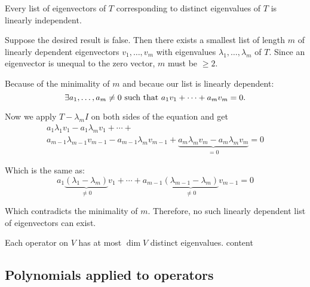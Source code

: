\setcounter{thm}{10}
\begin{thm}
  \label{thm: linearly independent eigenvectors}
  Every list of eigenvectors of $T$ corresponding to distinct eigenvalues of $T$ is linearly independent.
\end{thm}
\begin{prf}
  Suppose the desired result is false. Then there exists a smallest list of length $m$ of linearly depen\-dent eigenvectors $v_1, \dots, v_m$ with eigenvalues $\lambda_1, \dots, \lambda_m$ of $T$. Since an eigenvector is unequal to the zero vector, $m$ must be $\geq 2$.

  Because of the minimality of $m$ and becaue our list is linearly dependent: 
  \begin{equation}
    \exists a_1, \dots, a_m \neq 0$ such that $a_1 v_1 + \cdots + a_m v_m = 0. 
  \end{equation}
  
  Now we apply $T-\lambda_m I$ on both sides of the equation and get
  \begin{equation}
    \begin{gathered}
      a_1 \lambda_1 v_1 - a_1 \lambda_m v_1
      + \cdots + \\
      a_{m-1} \lambda_{m-1} v_{m-1} - a_{m-1} \lambda_{m} v_{m-1} +
      \underbrace{a_m \lambda_m v_m -a_m \lambda_m v_m}_{=0} =0
    \end{gathered}
  \end{equation}

  Which is the same as:
  \begin{equation}
    a_1 \underbrace{(\lambda_1 - \lambda_m)}_{\neq 0} v_1 + \cdots + a_{m-1} \underbrace{(\lambda_{m-1}-\lambda_{m})}_{\neq 0} v_{m-1}=0
  \end{equation}

  Which contradicts the minimality of $m$. Therefore, no such linearly dependent list of eigenvectors can exist.
  
\end{prf}

\begin{thm}
  Each operator on $V$ has at most $\dim V$ distinct eigenvalues.
  content
\end{thm}


\subsection{Polynomials applied to operators}

